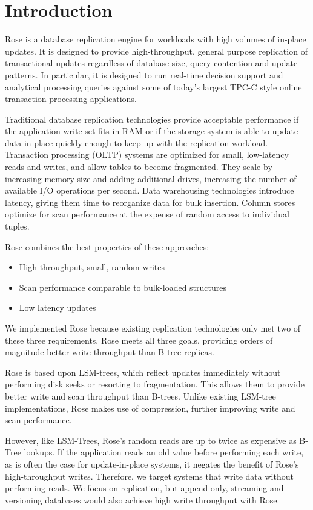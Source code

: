 \documentclass{vldb}
\newcommand{\rows}{Rose\xspace}
\newcommand{\rowss}{Rose's\xspace}
\begin{document}
\section{Introduction}

\rows is a database replication engine for workloads with high volumes
of in-place updates.  It is designed to provide high-throughput,
general purpose replication of transactional updates regardless of
database size, query contention and update patterns.  In particular, it
is designed to run real-time decision support and analytical
processing queries against some of today's largest TPC-C style online
transaction processing applications.

Traditional database replication technologies provide acceptable
performance if the application write set fits in RAM or if the
storage system is able to update data in place quickly enough to keep
up with the replication workload.  Transaction processing (OLTP)
systems are optimized for small, low-latency reads and writes, and
allow tables to become fragmented.  They scale by increasing memory
size and adding additional drives, increasing the number of available
I/O operations per second.  Data warehousing technologies introduce
latency, giving them time to reorganize data for bulk insertion.
Column stores optimize for scan performance at the expense of random
access to individual tuples.

\rows combines the best properties of these approaches:

\begin{itemize}
\item High throughput, small, random writes
\item Scan performance comparable to bulk-loaded structures
\item Low latency updates
\end{itemize}

We implemented \rows because existing replication technologies
only met two of these three requirements.  \rows meets all three
goals, providing orders of magnitude better write throughput than
B-tree replicas.

\rows is based upon LSM-trees, which reflect updates
immediately without performing disk seeks or resorting to
fragmentation.  This allows them to provide better write and scan
throughput than B-trees.  Unlike existing LSM-tree implementations,
\rows makes use of compression, further improving write and
scan performance.

However, like LSM-Trees, \rowss random reads are up to twice as
expensive as B-Tree lookups.  If the application reads an old value
before performing each write, as is often the case for update-in-place
systems, it negates the benefit of \rowss high-throughput writes.
Therefore, we target systems that write data without performing reads.
We focus on replication, but append-only, streaming and versioning
databases would also achieve high write throughput with \rows.
\end{document}
